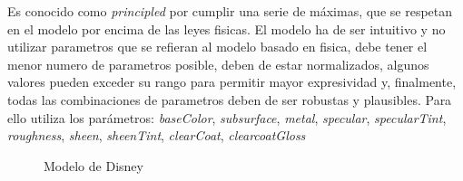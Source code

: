     Es conocido como \textit{principled} por cumplir una serie de m\'aximas, que se respetan en el modelo por encima de las leyes fisicas.
    El modelo ha de ser intuitivo y no utilizar parametros que se refieran al modelo basado en fisica, debe tener el menor
    numero de parametros posible, deben de estar normalizados, algunos valores pueden exceder su rango para permitir mayor
    expresividad y, finalmente, todas las combinaciones de parametros deben de ser robustas y plausibles. Para ello utiliza los
    par\'ametros: \textit{baseColor}, \textit{subsurface}, \textit{metal}, \textit{specular}, \textit{specularTint}, \textit{roughness},
    \textit{sheen}, \textit{sheenTint}, \textit{clearCoat}, \textit{clearcoatGloss}
    
    \begin{figure}[H]
        \vspace{0.5cm}
        \centering
        \caption{Modelo de Disney}
    \end{figure}
        
